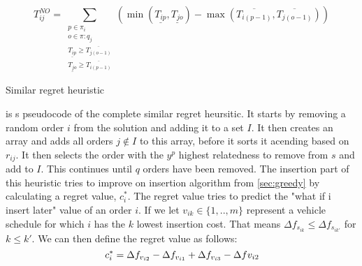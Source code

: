 \documentclass[../main.tex]{subfiles}
\begin{document}
\begin{equation}\label{eq:not}
    T^{NO}_{ij} = \sum\limits_{\substack{p\in \pi_i\\ o\in \pi:q_j\\ \underline{T_{ip}}\geq \overline{T_{j(o-1)}}\\ \underline{T_{jo}}\geq\overline{T_{i(p-1)}}}} 
    (\min(\underline{T_{ip}}, \underline{T_{jo}}) - \max(\overline{T_{i(p-1)}},\overline{T_{j(o-1)}}) ) 
\end{equation}

\begin{algorithm}
    \caption{Similar regret heuristic}\label{alg:simReg}
    \begin{algorithmic}[1]
        $, $p$}
        \State select the number of orders to reinsert $q$
        \State select a random order $i$ from $s$
        \State add $i$ to order set $I$
        \Repeat
            \State add all orders $j\not\in I$ in array $A$ acending based on relatedness $r_{ij}$
            \State choose a random number $y$ between $[0,1]$
            \State remove the order in position $y^p$ in $A$ from $s$ 
            \State add removed order to $I$
        \Until {$|I| = q$}
        \Repeat
            \State sort $I$ acending based on regret value $c^*_i$
            \State insert the first order $z$ from $I$ in its best possible position in $S_v$
            \State update $s$ based on $S_v$
            \State remove order $z$ from $I$
        \Until{$|I| = 0$}
        \State
        \Return $s$
        \EndFunction
    \end{algorithmic}
\end{algorithm}


 is s pseudocode of the complete similar regret heursitic.
It starts by removing a random order $i$ from the solution and adding it to a set $I$. 
It then creates an array and adds all orders $j\not\in I$ to this array, before it sorts it acending based on $r_{ij}$.
It then selects the order with the $y^p$ highest relatedness to remove from $s$ and add to $I$. This continues until $q$ orders have been removed.
The insertion part of this heuristic tries to improve on insertion algorithm from \cref{sec:greedy} by calculating a regret value, $c^*_i$. The regret value tries to predict the "what if i insert later" value of an order $i$. 
If we let $v_{ik} \in \{ 1,..,m\}$ represent a vehicle schedule for which $i$ has the $k$ lowest insertion cost. 
That means $\Delta f_{s_{ik}} \leq \Delta f_{s_{ik'}}$ for $k\leq k'$.
We can then define the regret value as follows:
\begin{equation}\label{eq:regret}
    \centering
    c^*_i=\Delta f_{v_{i2}} - \Delta f_{v_{i1}} + \Delta f_{v_{i3}} - \Delta f{v_{i2}}
\end{equation}
\end{document}
